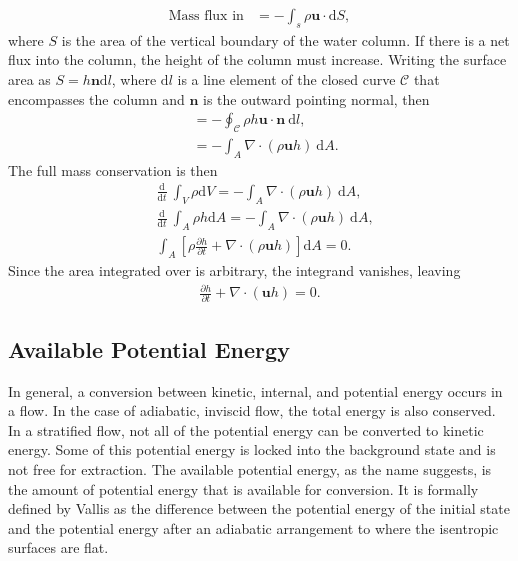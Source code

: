 \begin{align}
\text{Mass flux in} &= -\int_s \rho \mathbf{u} \cdot \text{d}S,
\end{align}
where $S$ is the area of the vertical boundary of the water column. If there is a net flux into the column, the height of the column must increase. Writing the surface area as $S = h\mathbf{n}\text{d}l$, where $\text{d}l$ is a line element of the closed curve $\mathcal{C}$ that encompasses the column and $\mathbf{n}$ is the outward pointing normal, then
\begin{align}
&= -\oint_{\mathcal{C}} \rho h\mathbf{u} \cdot \mathbf{n} ~\text{d}l,\\
&= -\int_A  \nabla \cdot (\rho\mathbf{u}h) ~\text{d}A.
\end{align}
The full mass conservation is then
\begin{align} 
&\frac{\text{d}}{\text{d}t} ~\int_V \rho \text{d}V = -\int_A  \nabla \cdot (\rho\mathbf{u}h) ~\text{d}A,\\
&\frac{\text{d}}{\text{d}t} ~\int_A \rho h \text{d}A = -\int_A  \nabla \cdot (\rho\mathbf{u}h)~ \text{d}A,\\
&\int_A \left[\rho \frac{\partial h}{\partial t} + \nabla \cdot (\rho\mathbf{u}h) \right]\text{d}A = 0.
\end{align}
Since the area integrated over is arbitrary, the integrand vanishes, leaving
\begin{align}
\frac{\partial h}{\partial t} + \nabla \cdot (\mathbf{u}h) = 0.
\end{align}

\subsection{Available Potential Energy}
\label{sec:APE}

In general, a conversion between kinetic, internal, and potential energy occurs in a flow. In the case of adiabatic, inviscid flow, the total energy is also conserved. In a stratified flow, not all of the potential energy can be converted to kinetic energy. Some of this potential energy is locked into the background state and is not free for extraction. The available potential energy, as the name suggests, is the amount of potential energy that is available for conversion. It is formally defined by Vallis as the difference between the potential energy of the initial state and the potential energy after an adiabatic arrangement to where the isentropic surfaces are flat.\\

